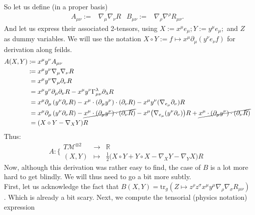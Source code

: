 \documentclass[a4paper,11pt]{article}
\numberwithin{equation}{section}
\theoremstyle{definition}
\begin{document}
\noindent So let us define (in a proper basis)
\begin{align}
    A_{\mu\nu} :=& \nabla_\mu\nabla_\nu R&
    B_{\mu\nu} :=& \nabla_\rho\nabla^\rho R_{\mu\nu}.
\end{align}
And let us express their associated 2-tensors, using $X:=x^\mu e_\mu; Y:=y^\mu e_\mu;$ and $Z$ as dummy variables. We will use the notation $X\circ Y:= f \mapsto x^\mu \partial_\mu (y^\nu e_\nu f)$ for derivation along feilds.
\begin{align}
    A(X,Y) :\!\!&= x^\mu y^\nu A_{\mu\nu}\notag\\
    :\!\!&= x^\mu y^\nu \nabla_\mu \nabla_\nu R\notag\\
    &= x^\mu y^\nu \nabla_\mu \partial_\nu R\notag\\
    &= x^\mu y^\nu \partial_\mu \partial_\nu R - x^\mu y^\nu \Gamma_{\mu\nu}^\lambda \partial_\lambda R\notag\\
    &= x^\mu \partial_\mu \left(y^\nu \partial_\nu R \right) - x^\mu \cdot(\partial_\mu y^\nu) \cdot (\partial_\nu R) - x^\mu y^\nu (\nabla_{e_\mu} \partial_\nu)R\notag\\
    &= x^\mu \partial_\mu \left(y^\nu \partial_\nu R \right) - \cancel{x^\mu \cdot(\partial_\mu y^\nu) \cdot (\partial_\nu R)} - x^\mu \big(\nabla_{e_\mu} (y^\nu \partial_\nu)\big)R + \cancel{x^\mu \cdot (\partial_\mu y^\nu) \cdot (\partial_\nu R)}\notag\\
    &= (X\circ Y - \nabla_X Y) R
\end{align}
Thus:
\begin{equation}
    A : \Bigg\{\begin{matrix}
        T\mathcal{M}^{\otimes 2} & \to & \mathbb{R}\\
        (X,Y) & \mapsto & \frac{1}{2}\big(X\circ Y + Y\circ X - \nabla_X Y - \nabla_Y X\big) R
    \end{matrix}
\end{equation}
Now, although this derivation was rather easy to find, the case of $B$ is a lot more hard to get blindly. We will thus need to go a bit more subtly.
\\
First, let us acknowledge the fact that $B(X,Y)=\mathrm{tr}_g(Z\mapsto z^\rho z^\sigma x^\mu y^\mu \nabla_\rho \nabla_\sigma R_{\mu\nu})$. Which is already a bit scary. Next, we compute the tensorial (physics notation) expression
\end{document}
